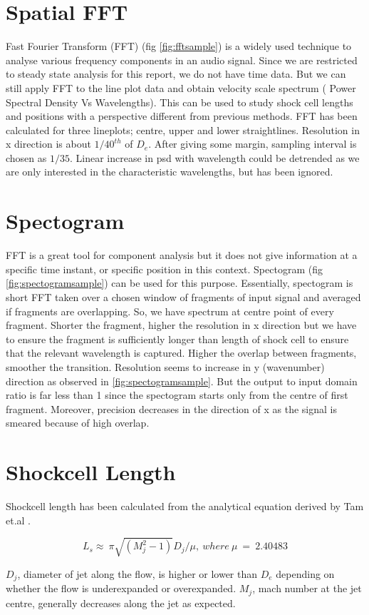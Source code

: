 \section{Spatial FFT}
Fast Fourier Transform (FFT) (fig \ref{fig:fftsample}) is a widely used technique to analyse various frequency components in an audio signal. Since we are restricted to steady state analysis for this report, we do not have time data. But we can still apply FFT to the line plot data and obtain velocity scale spectrum ( Power Spectral Density Vs Wavelengths). This can be used to study shock cell lengths and positions with a perspective different from previous methods. FFT has been calculated for three lineplots; centre, upper and lower straightlines. Resolution in x direction is about $1/40^{th}$ of $D_e$. After giving some margin, sampling interval is chosen as $1/35$. Linear increase in psd with wavelength could be detrended as we are only interested in the characteristic wavelengths, but has been ignored.

\section{Spectogram}
FFT is a great tool for component analysis but it does not give information at a specific time instant, or specific position in this context. Spectogram (fig \ref{fig:spectogramsample}) can be used for this purpose. Essentially, spectogram is short FFT taken over a chosen window of fragments of input signal and averaged if fragments are overlapping. So, we have spectrum at centre point of every fragment. Shorter the fragment, higher the resolution in x direction but we have to ensure the fragment is sufficiently longer than length of shock cell to ensure that the relevant wavelength is captured. Higher the overlap between fragments, smoother the transition. Resolution seems to increase in y (wavenumber) direction as observed in \ref{fig:spectogramsample}. But the output to input domain ratio is far less than 1 since the spectogram starts only from the centre of first fragment. Moreover, precision decreases in the direction of x as the signal is smeared because of high overlap. 

\section{Shockcell Length}
Shockcell length has been calculated from the analytical equation derived by Tam et.al \cite{tam1}.

\begin{equation}\label{eq:1}
L_s \approx \ \pi \sqrt{(M_j^2-1)} D_j/\mu, \ where \ \mu \ = \ 2.40483
\end{equation}

$D_j$, diameter of jet along the flow, is higher or lower than $D_e$ depending on whether the flow is underexpanded or overexpanded. $M_j$, mach number at the jet centre, generally decreases along the jet as expected. 

%